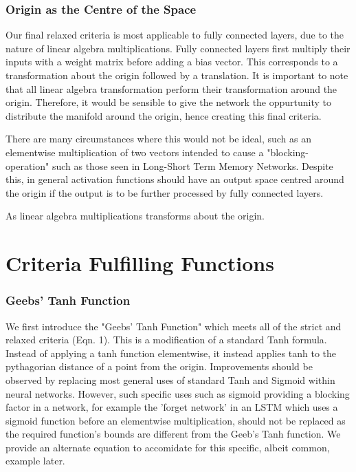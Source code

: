 \documentclass[onecolumn]{article}
\begin{document}
    \subsubsection{Origin as the Centre of the Space}
        
    Our final relaxed criteria is most applicable to fully connected layers, due to the nature of linear algebra multiplications. Fully connected layers first multiply their inputs with a weight matrix before adding a bias vector. This corresponds to a transformation about the origin followed by a translation. It is important to note that all linear algebra transformation perform their transformation around the origin. Therefore, it would be sensible to give the network the oppurtunity to distribute the manifold around the origin, hence creating this final criteria.
    
    There are many circumstances where this would not be ideal, such as an elementwise multiplication of two vectors intended to cause a "blocking-operation" such as those seen in Long-Short Term Memory Networks. Despite this, in general activation functions should have an output space centred around the origin if the output is to be further processed by fully connected layers.
    
    As linear algebra multiplications transforms about the origin.
       
    \section{Criteria Fulfilling Functions}
    \subsubsection{Geebs' Tanh Function}
    
    We first introduce the "Geebs' Tanh Function" which meets all of the strict and relaxed criteria (Eqn. 1). This is a modification of a standard Tanh formula. Instead of applying a tanh function elementwise, it instead applies tanh to the pythagorian distance of a point from the origin. Improvements should be observed by replacing most general uses of standard Tanh and Sigmoid within neural networks. However, such specific uses such as sigmoid providing a blocking factor in a network, for example the 'forget network' in an LSTM which uses a sigmoid function before an elementwise multiplication, should not be replaced as the required function's bounds are different from the Geeb's Tanh function. We provide an alternate equation to accomidate for this specific, albeit common, example later.
\end{document}
